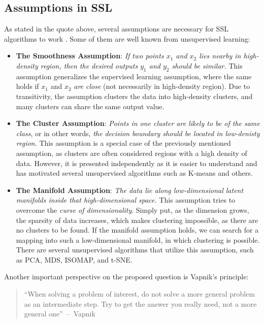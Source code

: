 \subsection*{Assumptions in SSL}
As stated in the quote above, several assumptions are necessary for SSL algorithms to work \cite[p. 5]{ssl-book-2006}. 
Some of them are well known from unsupervised learning:
\begin{itemize}
    \item \textbf{The Smoothness Assumption}: \textit{If two points $x_1$ and $x_2$ lies nearby in high-density region, then the desired outputs $y_1$ 
    and $y_2$ should be similar.} This assumption generalizes the supervised learning assumption, where the same holds if $x_1$ and $x_2$ \textit{are 
    close} (not necessarily in high-density region). Due to transitivity, the assumption clusters the data into high-density clusters, and many clusters
    can share the same output value.
    \item \textbf{The Cluster Assumption}: \textit{Points in one cluster are likely to be of the same class}, or in other words, \textit{the decision 
    boundary should be located in low-denisty region.} This assumption is a special case of the previously mentioned assumption, as clusters are often 
    considered regions with a high density of data. However, it is presented independently as it is easier to understand and has motivated several 
    unsupervised algorithms such as K-means and others. %
    \item \textbf{The Manifold Assumption}: \textit{The data lie along low-dimensional latent manifolds inside that high-dimensional space.} This
    assumption tries to overcome the \textit{curse of dimensionality}. Simply put, as the dimension grows, the sparsity of data increases, which makes 
    clustering impossible, as there are no clusters to be found. If the manifold assumption holds, we can search for a mapping into such a 
    low-dimensional manifold, in which clustering is possible. There are several unsupervised algorithms that utilize this assumption, such as PCA, 
    MDS, ISOMAP, and t-SNE.
\end{itemize}

Another important perspective on the proposed question is Vapnik's principle\cite[p. 7]{ssl-book-2006}:

\begin{quote}
    ``When solving a problem of interest, do not solve a more general problem as an intermediate step. 
    Try to get the answer you really need, not a more general one''~--~Vapnik \cite{vapnik-quote-2006}
\end{quote}

